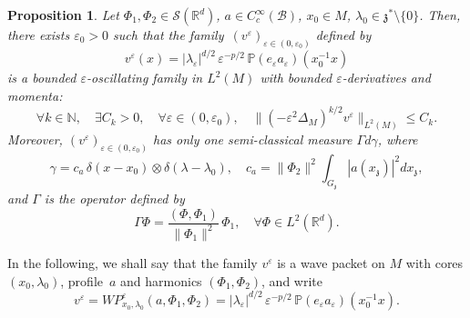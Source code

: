 \documentclass[JEP,XML,SOM,Unicode,published]{cedram}
\let\mathcal\mathscr
\theoremstyle{plain}
\newtheorem{proposition}[theorem]{Proposition}
\theoremstyle{definition}
\let\eps\varepsilon
\def\R{{\mathbb R}}
\def\N{{\mathbb N}}
\def\bbP{{\mathbb P}}
\begin{document}
\begin{proposition}\label{prop:WP}
Let $\Phi_1,\Phi_2\in \mathcal S(\R^d)$, $a\in C_c^\infty(\mathcal B)$,
$x_0\in M$, $\lambda_0\in\mathfrak z^*\setminus\{0\}$. Then, there exists $\eps_0>0$ such that the family~$(v^\eps)_{\eps\in(0,\eps_0)}$ defined by
\[
v^\eps (x)=|\lambda_\eps|^{d/2}\,\eps^{-p/2}
\, {\bbP} (e_\eps a_\eps)(x_0^{-1} x)
\]
is a bounded $\eps$-oscillating family in $L^2(M)$ with bounded $\eps$-derivatives and momenta:
\begin{equation}\label{eq:WPsobolev}
\forall k\in\N,\quad \exists C_k>0,\quad \forall \eps\in(0,\eps_0),\quad \| (-\eps^2\Delta_M)^{k/2} v^\eps\|_{L^2(M)}\leq C_k.
\end{equation}
Moreover, $(v^\eps)_{\eps\in(0,\eps_0)}$ has only one semi-classical measure $\Gamma d\gamma$, where
\begin{equation}\label{eq:WPmeasures}
\gamma=c_a\, \delta(x-x_0) \otimes \delta (\lambda-\lambda_0),\quad c_a= \|\Phi_2\|^2\int_{G_{\mathfrak z}} |a(x_{\mathfrak z})|^2 d x_{\mathfrak z},
\end{equation}
and $\Gamma$ is the operator
defined by
\[
\Gamma\Phi= \frac{(\Phi,\Phi_1)}{\|\Phi_1\|^2}\, \Phi_1,\quad \forall \Phi\in L^2(\R^d).
\]
\end{proposition}

In the following, we shall say that the family $v^\eps$ is a wave packet on $M$ with cores $(x_0,\lambda_0)$, profile~$a$ and harmonics $(\Phi_1,\Phi_2)$, and write
\[
v^\eps= WP^\eps_{x_0,\lambda_0}(a,\Phi_1,\Phi_2)=|\lambda_\eps|^{d/2}\,\eps^{-p/2}
\, {\bbP} (e_\eps a_\eps)(x_0^{-1}x).
\]
\end{document}
